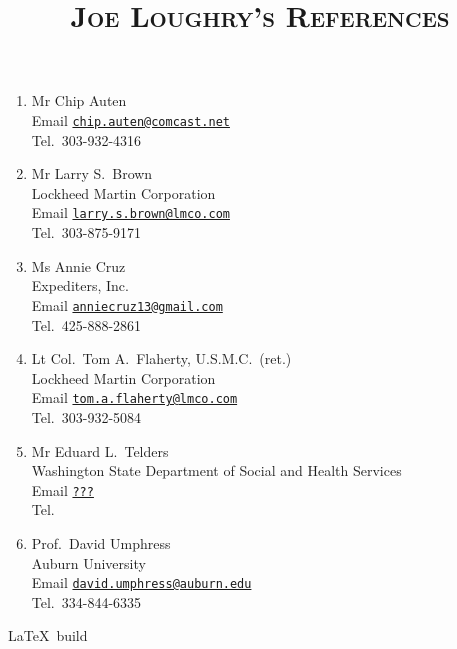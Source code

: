 \documentclass[12pt,letterpaper]{article}
\date{}
\title{\textsc{Joe Loughry's References}}
\author{}
\begin{document}
\maketitle
\thispagestyle{empty}

\begin{enumerate}

	\item Mr Chip Auten \\
		Email \href{mailto:chip.auten@comcast.net}{\nolinkurl{chip.auten@comcast.net}} \\
		Tel.\ 303-932-4316

	\item Mr Larry S.~Brown \\
		Lockheed Martin Corporation \\
		Email \href{mailto:larry.s.brown@lmco.com}{\nolinkurl{larry.s.brown@lmco.com}} \\
		Tel.\ 303-875-9171

	\item Ms Annie Cruz \\
		Expediters, Inc. \\
		Email \href{mailto:anniecruz13@gmail.com}{\nolinkurl{anniecruz13@gmail.com}} \\
		Tel.\ 425-888-2861

	\item Lt Col.\ Tom A.~Flaherty, U.S.M.C.~(ret.) \\
		Lockheed Martin Corporation \\
		Email \href{mailto:tom.a.flaherty@lmco.com}{\nolinkurl{tom.a.flaherty@lmco.com}} \\
		Tel.\ 303-932-5084

	\item Mr Eduard L.~Telders \\
		Washington State Department of Social and Health Services \\
		Email \href{mailto:???}{\nolinkurl{???}} \\
		Tel.\ 

	\item Prof.\ David Umphress \\
		Auburn University \\
		Email \href{mailto:david.umphress@auburn.edu}{\nolinkurl{david.umphress@auburn.edu}} \\
		Tel.\ 334-844-6335 

\end{enumerate}

\vfill
{\tiny \LaTeX\ build }
\end{document}
